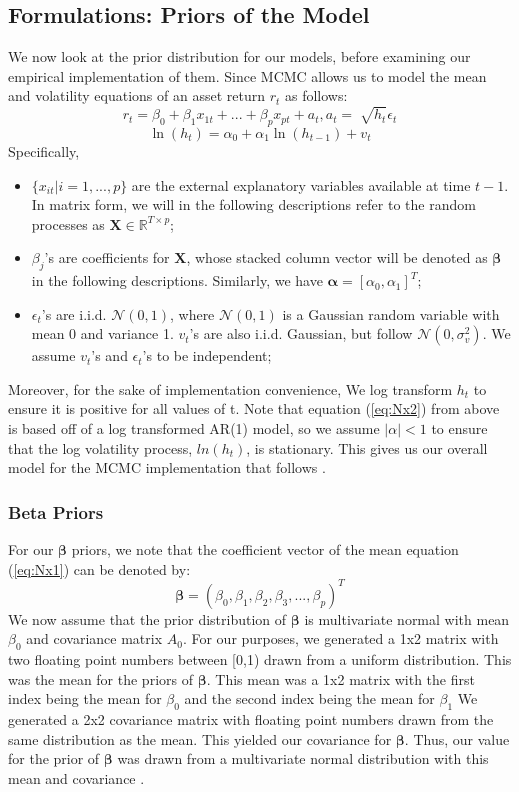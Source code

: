 \documentclass[letterpaper]{article}
\newcommand{\XX}{\mathbf{X}}
\begin{document}
\subsection{Formulations: Priors of the Model}
We now look at the prior distribution for our models, before examining our empirical implementation of them. Since MCMC allows us to model the mean and volatility equations of an asset return $r_t$ as follows:
\begin{equation}
r_{t} = \beta_{0} + \beta_{1} x_{1t} + ... + \beta_{p} x_{pt} + a_{t},
a_{t} = \sqrt[]{h_t}\epsilon_{t}
\label{eq:Nx1}
\end{equation}
\begin{equation}
\ln(h_{t}) = \alpha_{0} + \alpha_{1}\ln(h_{t-1}) + v_t
\label{eq:Nx2}
\end{equation}
Specifically,
\begin{itemize}
\item $\{x_{it} | i=1,...,p\}$ are the external explanatory variables available at time $t - 1$. In matrix form, we will in the following descriptions refer to the random processes as $\XX\in\mathbb{R}^{T\times p}$;
\item $\beta_{j}$'s are coefficients for $\XX$, whose stacked column vector will be denoted as $\bm{\beta}$ in the following descriptions. Similarly, we have $\bm{\alpha}=[\alpha_0,\alpha_1]^T$;
\item $\epsilon_{t}$'s are i.i.d. $\mathcal{N}(0,1)$, where $\mathcal{N}(0,1)$ is a Gaussian random variable with mean 0 and variance 1. $v_{t}$'s are also i.i.d. Gaussian, but follow $\mathcal{N}(0,\sigma^2_v)$. We assume $v_t$'s and $\epsilon_{t}$'s to be independent;
\end{itemize}
Moreover, for the sake of implementation convenience, We log transform $h_t$ to ensure it is positive for all values of t. Note that equation (\ref{eq:Nx2}) from above is based off of a log transformed AR(1) model, so we assume $|\alpha| < 1$ to ensure that the log volatility process, $ln(h_t)$, is stationary. This gives us our overall model for the MCMC implementation that follows \cite{tsay2002}.
\subsubsection{Beta Priors}
For our $\bm{\beta}$ priors, we note that the coefficient vector of the mean equation (\ref{eq:Nx1})  can be denoted by:
$$ \bm{\beta} = (\beta_{0}, \beta_{1}, \beta_{2}, \beta_{3}, ..., \beta_{p})^T $$
We now assume that the prior distribution of $\bm{\beta}$ is multivariate normal with mean $\beta_{0}$ and covariance matrix $A_{0}$. For our purposes, we generated a 1x2 matrix with two floating point numbers between [0,1) drawn from a uniform distribution. This was the mean for the priors of $\bm{\beta}$. This mean was a 1x2 matrix with the first index being the mean for $\beta_{0}$ and the second index being the mean for $\beta_{1}$ We generated a 2x2 covariance matrix with floating point numbers drawn from the same distribution as the mean. This yielded our covariance for $\bm{\beta}$. Thus, our value for the prior of $\bm{\beta}$ was drawn from a multivariate normal distribution with this mean and covariance \cite{tsay2002}.
\end{document}
